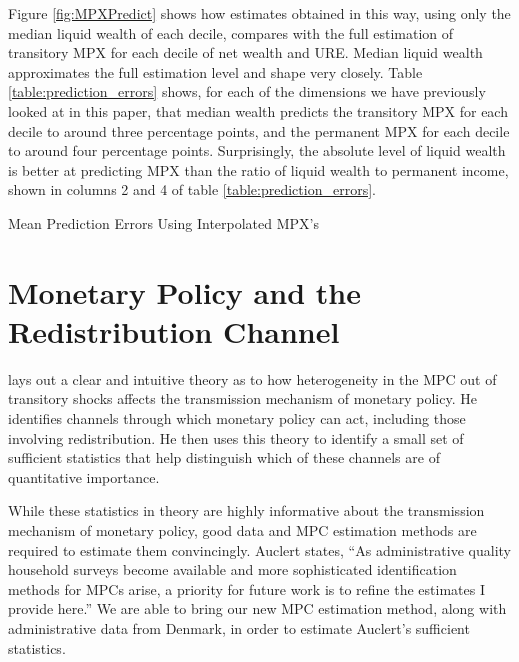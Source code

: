 \documentclass[titlepage]{\econtex}\newcommand{\texname}{ConsumptionHeterogeneity}
\begin{document}
	Figure \ref{fig:MPXPredict} shows how estimates obtained in this way, using only the median liquid wealth of each decile, compares with the full estimation of transitory MPX for each decile of net wealth and URE. Median liquid wealth approximates the full estimation level and shape very closely. Table \ref{table:prediction_errors} shows, for each of the dimensions we have previously looked at in this paper, that median wealth predicts the transitory MPX for each decile to around three percentage points, and the permanent MPX for each decile to around four percentage points. Surprisingly, the absolute level of liquid wealth is better at predicting MPX than the ratio of liquid wealth to permanent income, shown in columns 2 and 4 of table \ref{table:prediction_errors}.

	\begin{center}
	\begin{table}
		\caption{Mean Prediction Errors Using Interpolated MPX's}
		\label{table:prediction_errors}
		\begin{center}
			
		\end{center}
	\end{table}
	\end{center}

	\section{Monetary Policy and the Redistribution Channel} \label{monetary_policy}
	\cite{auclert_monetary_2017} lays out a clear and intuitive theory as to how heterogeneity in the MPC out of transitory shocks affects the transmission mechanism of monetary policy. He identifies channels through which monetary policy can act, including those involving redistribution. He then uses this theory to identify a small set of sufficient statistics that help distinguish which of these channels are of quantitative importance.

	While these statistics in theory are highly informative about the transmission mechanism of monetary policy, good data and MPC estimation methods are required to estimate them convincingly. Auclert states, ``As administrative quality household surveys become available and more sophisticated identification methods for MPCs arise, a priority for future work is to refine the estimates I provide here.'' We are able to bring our new MPC estimation method, along with administrative data from Denmark, in order to estimate Auclert's sufficient statistics.
\end{document}
